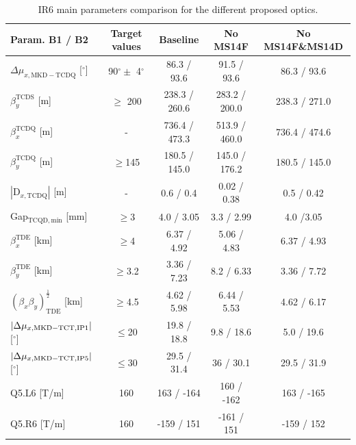 \documentclass{cernatsnote}
\begin{document}
\begin{table}[h!]
\begin{center}
\caption{\label{tab_circuit_ms10} IR6 main parameters comparison for the different proposed optics.}
\begin{tabular}{lcccc} \hline
Param. B1 / B2 &  Target values  &   Baseline    &    No MS14F     &   No MS14F\&MS14D  \\ \hline
$\Delta\mu_{x,\mathrm{MKD-TCDQ}}$ [$^{\circ}$]  &  90$^{\circ} \pm$ 4$^{\circ}$  &    86.3 / 93.6   &     91.5 / 93.6    &    86.3 / 93.6  \\ 
$\beta_{y}^{\mathrm{TCDS}}$       [m]       &  $\geq$ 200            &    238.3 / 260.6   &  283.2 / 200.0   &    238.3 / 271.0   \\
$\beta_{x}^{\mathrm{TCDQ}}$       [m]       &   -             &    736.4 / 473.3   &  513.9 / 460.0   &    736.4 / 474.6   \\
$\beta_{y}^{\mathrm{TCDQ}}$       [m]       &  $\geq$145                   &    180.5 / 145.0  &  145.0 / 176.2   &    180.5 / 145.0   \\
$|\mathrm{D}_{x,\mathrm{TCDQ}}|$  [m]       &   -                 &    0.6 / 0.4       &     0.02 / 0.38  &    0.5 / 0.42       \\ 
Gap$_{\mathrm{TCQD,min}}$   [mm]       &    $\geq$3                 &    4.0 / 3.05      &    3.3  / 2.99  &    4.0 /3.05        \\ 
$\beta_{x}^{\mathrm{TDE}}$        [km]      &  $\geq$4                     &    6.37 / 4.92   &  5.06 / 4.83   &    6.37 / 4.93   \\
$\beta_{y}^{\mathrm{TDE}}$        [km]      &  $\geq$3.2                     &    3.36 / 7.23   &  8.2 / 6.33   &    3.36 / 7.72   \\
$(\beta_{x}\beta_{y})_{\mathrm{TDE}}^{\frac{1}{2}}$ [km] &       $\geq$4.5          &   4.62 / 5.98   &  6.44 / 5.53   &    4.62 / 6.17   \\
$|\Delta\mu_{x,\mathrm{MKD-TCT,\small{IP1}}}|$ [$^{\circ}$]  &    $\leq$20          &    19.8 / 18.8   &  9.8 / 18.6   &    5.0 / 19.6   \\        
$|\Delta\mu_{x,\mathrm{MKD-TCT,\small{IP5}}}|$ [$^{\circ}$]  &    $\leq$30          &    29.5 / 31.4   &  36 / 30.1   &    29.5 / 31.9   \\        
Q5.L6 [T/m]                                 &   160                        &            163 / -164             &           160 / -162                   &         163 / -165                     \\
Q5.R6 [T/m]                                 &   160                        &            -159 /  151      &               -161 / 151               &            -159 / 152                  \\ \hline

\end{tabular}
\end{center}
\end{table}
\end{document}
